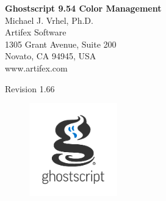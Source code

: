 \documentclass[12pt,notitlepage]{article}
\begin{document}
\begin{titlepage}

\begin{center}{\huge \bf Ghostscript 9.54 Color Management\\} \vspace{0.5in} {\Large Michael J.
Vrhel, Ph.D.\\} {\Large Artifex Software\\} {\Large 1305 Grant Avenue, Suite 200\\} {\Large Novato, CA 94945, USA\\}
{\Large www.artifex.com\\}
\end{center}
\vspace*{0.5in}
\begin{abstract}
This document provides information about the color architecture in Ghostscript 9.54. The document is suitable for users who wish to
obtain accurate color with their output device as well as for developers who wish to customize Ghostscript to achieve a higher
level of control and/or interface with a different color management module.
\end{abstract}
\begin{center}
\vspace*{0.25in}
Revision 1.66
\vspace*{0.25in}
\capstartfalse
\begin{figure}[h]
    \begin{center}
\includegraphics*[width=1.5in]{figures/ghostscriptR_stack_RGBclr_CS6.pdf}
    \end{center}
\end{figure}
\capstarttrue

\end{center}

\end{titlepage}

\renewcommand{\baselinestretch}{1.67}\normalsize
\end{document}
